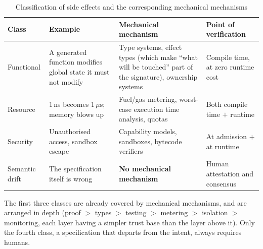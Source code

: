 \begin{table}[htbp]
\centering
\small
\caption{Classification of side effects and the corresponding mechanical mechanisms}\label{tab:effects}
\begin{tabular}{L{1.8cm}L{4.6cm}L{5.0cm}L{3.0cm}}
\toprule
\textbf{Class} & \textbf{Example} & \textbf{Mechanical mechanism} &
  \textbf{Point of verification} \\
\midrule
Functional & A generated function modifies global state it must not modify &
  Type systems, effect types (which make ``what will be touched'' part of the signature),
  ownership systems &
  Compile time, at zero runtime cost \\
Resource & 1\,ns becomes 1\,$\mu$s; memory blows up &
  Fuel/gas metering, worst-case execution time analysis, quotas &
  Both compile time $+$ runtime \\
Security & Unauthorised access, sandbox escape &
  Capability models, sandboxes, bytecode verifiers &
  At admission $+$ at runtime \\
Semantic drift & The specification itself is wrong &
  \textbf{No mechanical mechanism} & Human attestation and consensus \\
\bottomrule
\end{tabular}
\end{table}

The first three classes are already covered by mechanical mechanisms, and are arranged in
depth (proof $>$ types $>$ testing $>$ metering $>$ isolation $>$ monitoring, each layer
having a simpler trust base than the layer above it). Only the fourth class, a specification
that departs from the intent, always requires humans.

